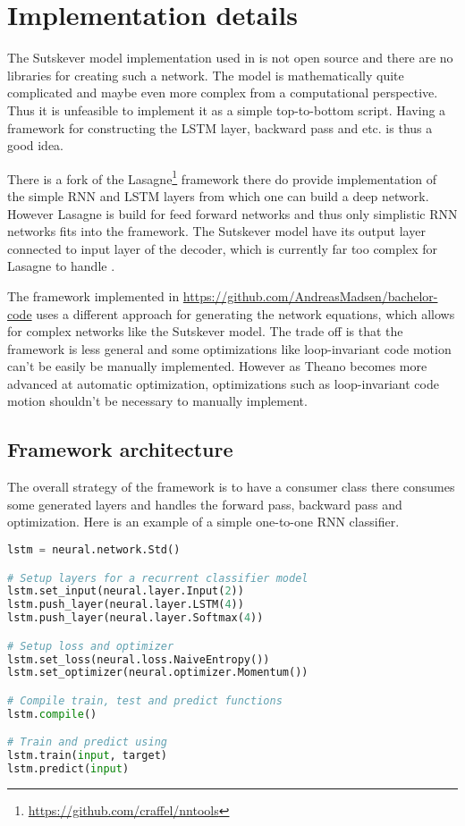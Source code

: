 \chapter{Implementation details}
\label{appendix:implementation}

The Sutskever model implementation used in \cite{sutskever} is not open source and there are no libraries for creating such a network. The model is mathematically quite complicated and maybe even more complex from a computational perspective. Thus it is unfeasible to implement it as a simple top-to-bottom script. Having a framework for constructing the LSTM layer, backward pass and etc. is thus a good idea.

There is a fork of the Lasagne\footnote{\url{https://github.com/craffel/nntools}} framework there do provide implementation of the simple RNN and LSTM layers from which one can build a deep network. However Lasagne is build for feed forward networks and thus only simplistic RNN networks fits into the framework. The Sutskever model have its output layer connected to input layer of the decoder, which is currently far too complex for Lasagne to handle \cite{lasagne-issue}.

The framework implemented in \url{https://github.com/AndreasMadsen/bachelor-code} uses a different approach for generating the network equations, which allows for complex networks like the Sutskever model. The trade off is that the framework is less general and some optimizations like loop-invariant code motion can't be easily be manually implemented.  However as Theano becomes more advanced at automatic optimization, optimizations such as loop-invariant code motion shouldn't be necessary to manually implement.

\section{Framework architecture}

The overall strategy of the framework is to have a consumer class there consumes some generated layers and handles the forward pass, backward pass and optimization. Here is an example of a simple one-to-one RNN classifier. 

\begin{lstlisting}[language=Python]
lstm = neural.network.Std()

# Setup layers for a recurrent classifier model
lstm.set_input(neural.layer.Input(2))
lstm.push_layer(neural.layer.LSTM(4))
lstm.push_layer(neural.layer.Softmax(4))

# Setup loss and optimizer
lstm.set_loss(neural.loss.NaiveEntropy())
lstm.set_optimizer(neural.optimizer.Momentum())

# Compile train, test and predict functions
lstm.compile()

# Train and predict using
lstm.train(input, target)
lstm.predict(input)
\end{lstlisting}

